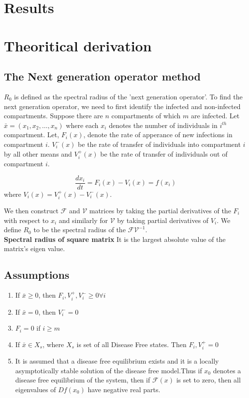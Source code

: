 \documentclass{article}
\begin{document}
\section{Results}
\section{Theoritical derivation}
\subsection{The Next generation operator method}
$R_{0}$ is defined as the spectral radius of the 'next generation
operator'.  To find the next generation operator, we need to first
identify the infected and non-infected compartments. Suppose there are
$n$ compartments of which $m$ are infected. Let $\bar{x}=(x_{1},x_{2},\dots,x_{n})$
where each $x_{i}$ denotes the number of individuals in $i^{th}$ compartment.
Let, $F_{i}(x)$, denote the rate of apperance of new infections in compartment $i$.
$V^{-}_{i}(x)$ be the rate of transfer of individuals into compartment $i$ by all other means and
$V^{+}_{i}(x)$ be the rate of transfer of individuals out of compartment $i$.

$$\frac{dx_{i}}{dt}=F_{i}(x)-V_{i}(x)= f(x_{i})$$  where $V_{i}(x)=V^{+}_{i}(x)-V^{-}_{i}(x)$.

We then construct $\mathcal{F}$ and $\mathcal{V}$ matrices by taking
the partial derivatives of the $F_{i}$ with respect to $x_{i}$ and
similarly for $\mathcal{V}$ by taking partial derivatives of $V_{i}$.
We define $R_{0}$ to be the spectral radius of the $\mathcal{F}\mathcal{V}^{-1}$.\\
\textbf{Spectral radius of square matrix} It is the  largest absolute value of the matrix's eigen value.


\subsection{Assumptions}
\begin{enumerate}
\item If $\bar{x} \geq 0$, then $F_{i},V_{i}^{+}, V_{i}^{-} \geq 0 \forall i$
\item If $\bar{x} = 0$, then $V_{i}^{-} = 0$
\item $F_{i} = 0$ if $i \geq m$
\item If $\bar{x} \in X_{s} $, where $X_{s}$ is set of all Disease Free states. Then $F_{i},V_{i}^{+}=0$
  \item It is assumed that a disease free equilibrium exists and it is a locally asymptotically stable solution of the disease free model.Thus if $x_{0}$ denotes a disease free equilibrium of the system, then if $\mathcal{F}(x)$ is set to zero, then all eigenvalues of $Df(x_{0})$ have negative real parts.
\end{enumerate}
\end{document}
